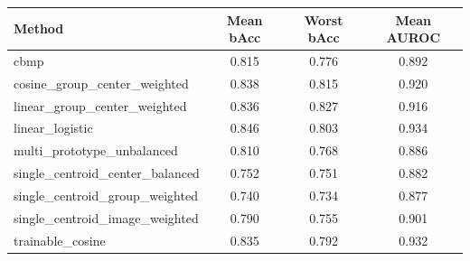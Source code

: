 \begin{tabular}{lccc}
Method & Mean bAcc & Worst bAcc & Mean AUROC \\
\hline
cbmp & 0.815 & 0.776 & 0.892 \\
cosine\_group\_center\_weighted & 0.838 & 0.815 & 0.920 \\
linear\_group\_center\_weighted & 0.836 & 0.827 & 0.916 \\
linear\_logistic & 0.846 & 0.803 & 0.934 \\
multi\_prototype\_unbalanced & 0.810 & 0.768 & 0.886 \\
single\_centroid\_center\_balanced & 0.752 & 0.751 & 0.882 \\
single\_centroid\_group\_weighted & 0.740 & 0.734 & 0.877 \\
single\_centroid\_image\_weighted & 0.790 & 0.755 & 0.901 \\
trainable\_cosine & 0.835 & 0.792 & 0.932 \\
\end{tabular}

